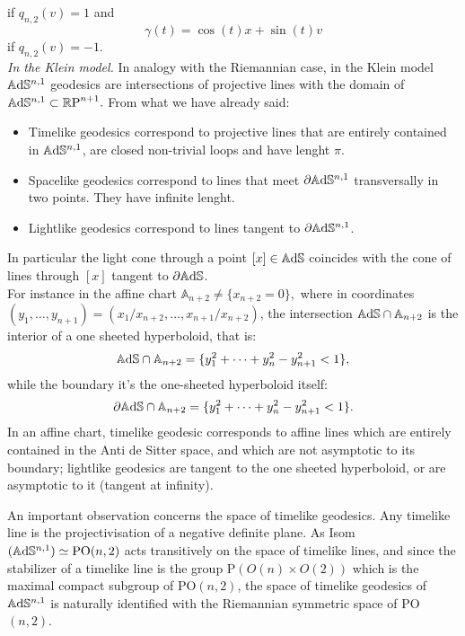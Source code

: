 if $q_{n,2}(v)=1$ and 
\[
    \gamma(t)=\cos(t)x+\sin(t)v
\]
if $q_{n,2}(v)=-1$.\\

\textit{In the Klein model.} In analogy with the Riemannian case, in the Klein model $\mathbb{A}\mathrm{d}\mathbb{S}^{n,1}$ geodesics are intersections of projective lines with the domain of $\mathbb{A}\mathrm{d}\mathbb{S}^{n,1}\subset\mathbb{R} \text{P}^{n+1}.$ From what we have already said: 
\begin{itemize}
    \item Timelike geodesics correspond to projective lines that are entirely contained in $\mathbb{A}\mathrm{d}\mathbb{S}^{n,1}$, are closed non-trivial loops and have lenght $\pi.$ 
    \item Spacelike geodesics correspond to lines that meet $\partial \mathbb{A}\mathrm{d}\mathbb{S}^{n,1}$ transversally in two points. They have infinite lenght.
    \item Lightlike geodesics correspond to lines tangent to $\partial\mathbb{A}\mathrm{d}\mathbb{S}^{n,1}$.   
\end{itemize}

In particular the light cone through a point $[x]\in \mathbb{A}\mathrm{d}\mathbb{S}$ coincides with the cone of lines through $[x]$ tangent to $\partial \mathbb{A}\mathrm{d}\mathbb{S}$.\\ For instance in the affine chart $\mathbb{A}_{n+2}\neq\{x_{n+2}=0\},$ where in coordinates $(y_1, \dots, y_{n+1})=(x_1/x_{n+2},\dots, x_{n+1}/x_{n+2})$, the intersection $\mathbb{A}\mathrm{d}\mathbb{S}\cap\mathbb{A}_{n+2}$ is the interior of a one sheeted hyperboloid, that is: 
\[
    \mathbb{A}\mathrm{d}\mathbb{S}\cap\mathbb{A}_{n+2}=\{y_1^2+\dots+y_n^2-y_{n+1}^2<1\},
\]
 while the boundary it's the one-sheeted hyperboloid itself: 
 \[
    \partial\mathbb{A}\mathrm{d}\mathbb{S}\cap\mathbb{A}_{n+2}=\{y_1^2+\dots+y_n^2-y_{n+1}^2<1\}.
\]
In an affine chart, timelike geodesic corresponds to affine lines which are entirely contained in the Anti de Sitter space, and which are not asymptotic to its boundary; lightlike geodesics are tangent to the one sheeted hyperboloid, or are asymptotic to it (tangent at infinity).

\begin{observation} An important observation concerns the space of timelike geodesics. Any timelike line is the projectivisation of a negative definite plane. As Isom$(\mathbb{A}\mathrm{d}\mathbb{S}^{n,1})\simeq \text{PO}(n,2)$ acts transitively on the space of timelike lines, and since the stabilizer of a timelike line is the group $\text{P}(O(n)\times O(2))$ which is the maximal compact subgroup of $\text{PO}(n,2)$, the space of timelike geodesics of $\mathbb{A}\mathrm{d}\mathbb{S}^{n,1}$ is naturally identified with the Riemannian symmetric space of PO$(n,2)$.
\end{observation}

